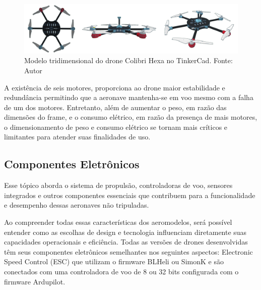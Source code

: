 \documentclass[conference]{IEEEtran}
\begin{document}
\begin{figure}[!htb]
    \centering
    \includegraphics[scale=0.14]{img/Colibri-hexa.png} 
    \caption{Modelo tridimensional do drone Colibri Hexa no TinkerCad. Fonte: Autor}
    \label{fig:my_label}
\end{figure}

A existência de seis motores, proporciona ao drone maior estabilidade e redundância permitindo que a aeronave mantenha-se em voo mesmo com a falha de um dos motores. Entretanto, além de aumentar o peso, em razão das dimensões do frame, e o consumo elétrico, em razão da presença de mais motores, o dimensionamento de peso e consumo elétrico se tornam mais críticos e limitantes para atender suas finalidades de uso.

\subsection{Componentes Eletrônicos}

Esse tópico aborda o  sistema de propulsão, controladoras de voo, sensores integrados e outros componentes essenciais que contribuem para a funcionalidade e desempenho dessas aeronaves não tripuladas.

Ao compreender todas essas características dos aeromodelos, será possível entender como as escolhas de design e tecnologia influenciam diretamente suas capacidades operacionais e eficiência. Todas as versões de drones desenvolvidas têm seus componentes eletrônicos semelhantes nos seguintes aspectos: Electronic Speed Control (ESC) que utilizam o firmware BLHeli ou SimonK e são conectados com uma controladora de voo de 8 ou 32 bits configurada com o firmware Ardupilot.
\end{document}
